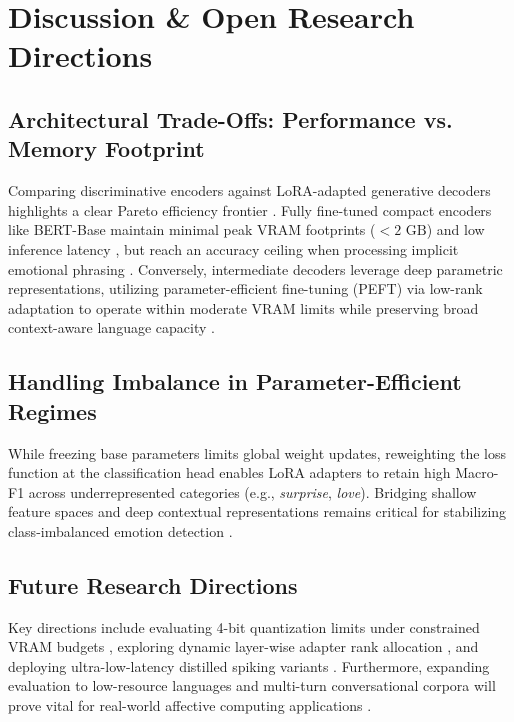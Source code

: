 \documentclass[conference]{IEEEtran}
\begin{document}
\section{Discussion \& Open Research Directions}
\label{sec:discussion}

\subsection{Architectural Trade-Offs: Performance vs. Memory Footprint}
Comparing discriminative encoders against LoRA-adapted generative decoders highlights a clear Pareto efficiency frontier 
\cite{benayas2025comparative, wang2025peft}. Fully fine-tuned compact encoders like BERT-Base maintain minimal peak VRAM 
footprints ($<2\text{ GB}$) and low inference latency \cite{stigall2024large}, but reach an accuracy ceiling when processing 
implicit emotional phrasing \cite{maruf2024challenges}. Conversely, intermediate decoders leverage deep parametric representations, 
utilizing parameter-efficient fine-tuning (PEFT) \cite{nwaiwu2025peft} via low-rank adaptation \cite{mohammed2026deepfake} to operate 
within moderate VRAM limits while preserving broad context-aware language capacity \cite{cheng2026personality}.

\subsection{Handling Imbalance in Parameter-Efficient Regimes}
While freezing base parameters limits global weight updates, reweighting the loss function at the classification head enables LoRA 
adapters to retain high Macro-F1 across underrepresented categories (e.g., \textit{surprise}, \textit{love}). Bridging shallow feature 
spaces and deep contextual representations remains critical for stabilizing class-imbalanced emotion detection \cite{Jayanthi_Kavitha_2026}.

\subsection{Future Research Directions}
Key directions include evaluating 4-bit quantization limits under constrained VRAM budgets \cite{wang2025peft}, exploring dynamic 
layer-wise adapter rank allocation \cite{liu-etal-2026-look}, and deploying ultra-low-latency distilled spiking variants \cite{lv2026spikebert}. 
Furthermore, expanding evaluation to low-resource languages and multi-turn conversational corpora \cite{alam2026beyond, cheng2026personality} 
will prove vital for real-world affective computing applications \cite{chakriswaran2019emotion}.
\end{document}
